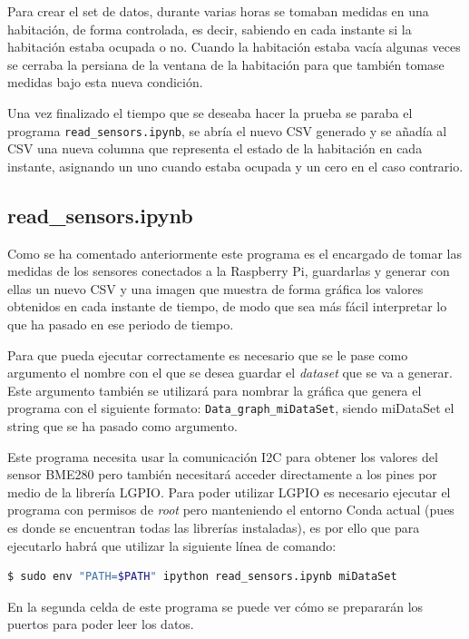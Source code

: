 \documentclass[a4paper, 12pt]{book}
\begin{document}
 Para crear el set de datos, durante varias horas se tomaban medidas en una habitación, de forma controlada, es decir, sabiendo en cada instante si la habitación estaba ocupada o no. Cuando la habitación estaba vacía algunas veces se cerraba la persiana de la ventana de la habitación para que también tomase medidas bajo esta nueva condición.

Una vez finalizado el tiempo que se deseaba hacer la prueba se paraba el programa \texttt{read\_sensors.ipynb}, se abría el nuevo CSV generado y se añadía al CSV una nueva columna que representa el estado de la habitación en cada instante, asignando un uno cuando estaba ocupada y un cero en el caso contrario.

\subsection{read\_sensors.ipynb}
\label{subsec_read_sensors}

Como se ha comentado anteriormente este programa es el encargado de tomar las medidas de los sensores conectados a la Raspberry Pi, guardarlas y generar con ellas un nuevo CSV y una imagen que muestra de forma gráfica los valores obtenidos en cada instante de tiempo, de modo que sea más fácil interpretar lo que ha pasado en ese periodo de tiempo. 

Para que pueda ejecutar correctamente es necesario que se le pase como argumento el nombre con el que se desea guardar el \textit{dataset} que se va a generar. Este argumento también se utilizará para nombrar la gráfica que genera el programa con el siguiente formato: \texttt{Data\_graph\_miDataSet}, siendo miDataSet el string que se ha pasado como argumento.

Este programa necesita usar la comunicación I2C para obtener los valores del sensor BME280 pero también necesitará acceder directamente a los pines por medio de la librería LGPIO. Para poder utilizar LGPIO es necesario ejecutar el programa con permisos de \textit{root} pero manteniendo el entorno Conda actual (pues es donde se encuentran todas las librerías instaladas), es por ello que para ejecutarlo habrá que utilizar la siguiente línea de comando: \\

\begin{lstlisting}[language=bash]
    $ sudo env "PATH=$PATH" ipython read_sensors.ipynb miDataSet
\end{lstlisting}

En la segunda celda de este programa se puede ver cómo se prepararán los puertos para poder leer los datos. 
\end{document}
